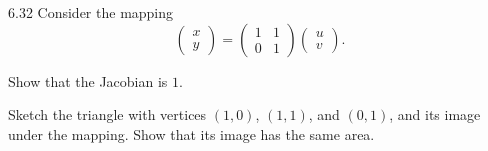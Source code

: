 \documentclass[11pt,oneside]{article}
\begin{document}
\begin{problem}{6.32}
Consider the mapping
\[
    \begin{pmatrix}x\\y\end{pmatrix}
    =\begin{pmatrix}1&1\\0&1\end{pmatrix}
     \begin{pmatrix}u\\v\end{pmatrix}.
\]
\begin{problemsubparts}
    \item Show that the Jacobian is $1$.
    \item Sketch the triangle with vertices $(1, 0)$, $(1, 1)$, and $(0, 1)$,
          and its image under the mapping. Show that its image has the same area.
\end{problemsubparts}
\end{problem}
\end{document}

